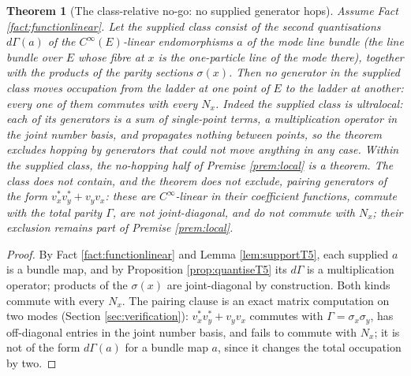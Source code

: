 \documentclass[11pt]{article}
\newtheorem{theorem}{Theorem}[section]
\theoremstyle{definition}
\begin{document}
\begin{theorem}[The class-relative no-go: no supplied generator hops]\label{thm:hopclass}
Assume Fact \ref{fact:functionlinear}. Let the \emph{supplied class} consist of the second quantisations $d\Gamma(a)$ of the $C^\infty(E)$-linear endomorphisms $a$ of the mode line bundle (the line bundle over $E$ whose fibre at $x$ is the one-particle line of the mode there), together with the products of the parity sections $\sigma(x)$. Then no generator in the supplied class moves occupation from the ladder at one point of $E$ to the ladder at another: every one of them commutes with every $N_x$. Indeed the supplied class is \emph{ultralocal}: each of its generators is a sum of single-point terms, a multiplication operator in the joint number basis, and propagates nothing between points, so the theorem excludes hopping by generators that could not move anything in any case. Within the supplied class, the no-hopping half of Premise \ref{prem:local} is a theorem. The class does not contain, and the theorem does not exclude, pairing generators of the form $v^{*}_x v^{*}_y + v_y v_x$: these are $C^\infty$-linear in their coefficient functions, commute with the total parity $\Gamma$, are not joint-diagonal, and do not commute with $N_x$; their exclusion remains part of Premise \ref{prem:local}.
\end{theorem}

\begin{proof}
By Fact \ref{fact:functionlinear} and Lemma \ref{lem:supportT5}, each supplied $a$ is a bundle map, and by Proposition \ref{prop:quantiseT5} its $d\Gamma$ is a multiplication operator; products of the $\sigma(x)$ are joint-diagonal by construction. Both kinds commute with every $N_x$. The pairing clause is an exact matrix computation on two modes (Section \ref{sec:verification}): $v^{*}_x v^{*}_y + v_y v_x$ commutes with $\Gamma = \sigma_x\sigma_y$, has off-diagonal entries in the joint number basis, and fails to commute with $N_x$; it is not of the form $d\Gamma(a)$ for a bundle map $a$, since it changes the total occupation by two.
\end{proof}
\end{document}
